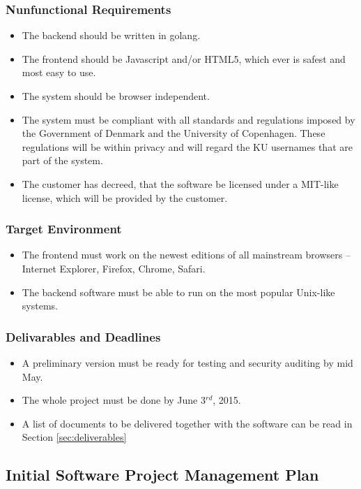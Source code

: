 \documentclass[11pt,a4paper]{article}
\begin{document}
\subsubsection{Nunfunctional Requirements}
\begin{itemize}
\item The backend should be written in golang.
\item The frontend should be Javascript and/or HTML5, which ever is safest and most easy to use.
\item The system should be browser independent.
\item The system must be compliant with all standards and regulations imposed by the Government of Denmark and the University of Copenhagen. These regulations will be within privacy and will regard the KU usernames that are part of the system.
\item The customer has decreed, that the software be licensed under a MIT-like license, which will be provided by the customer.
\end{itemize}
\subsubsection{Target Environment}
\begin{itemize}
\item The frontend must work on the newest editions of all mainstream browsers -- Internet Explorer, Firefox, Chrome, Safari.
\item The backend software must be able to run on the most popular Unix-like systems.
\end{itemize}
\subsubsection{Delivarables and Deadlines}\label{sec:deadlines}
\begin{itemize}
\item A preliminary version must be ready for testing and security auditing by mid May.
\item The whole project must be done by June 3$^{rd}$, 2015.
\item A list of documents to be delivered together with the software can be read in Section \ref{sec:deliverables}
\end{itemize}
\subsection{Initial Software Project Management Plan}
\end{document}
